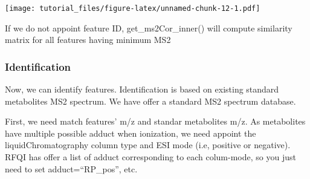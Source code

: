 \documentclass[
]{article}
\newenvironment{Shaded}{\begin{snugshade}}{\end{snugshade}}
\newcommand{\CommentTok}[1]{\textcolor[rgb]{0.56,0.35,0.01}{\textit{#1}}}
\newcommand{\DataTypeTok}[1]{\textcolor[rgb]{0.13,0.29,0.53}{#1}}
\newcommand{\DecValTok}[1]{\textcolor[rgb]{0.00,0.00,0.81}{#1}}
\newcommand{\KeywordTok}[1]{\textcolor[rgb]{0.13,0.29,0.53}{\textbf{#1}}}
\newcommand{\NormalTok}[1]{#1}
\newcommand{\OperatorTok}[1]{\textcolor[rgb]{0.81,0.36,0.00}{\textbf{#1}}}
\newcommand{\StringTok}[1]{\textcolor[rgb]{0.31,0.60,0.02}{#1}}
\begin{document}
\texttt{[image: tutorial\_files/figure-latex/unnamed-chunk-12-1.pdf]}

If we do not appoint feature ID, get\_ms2Cor\_inner() will compute
similarity matrix for all features having minimum MS2

\begin{Shaded}
\end{Shaded}

\hypertarget{identification}{%
\subsubsection{Identification}\label{identification}}

Now, we can identify features. Identification is based on existing
standard metabolites MS2 spectrum. We have offer a standard MS2 spectrum
database.

\begin{Shaded}
\end{Shaded}

First, we need match features' m/z and standar metabolites m/z. As
metabolites have multiple possible adduct when ionization, we need
appoint the liquidChromatography column type and ESI mode (i.e, positive
or negative). RFQI has offer a list of adduct corresponding to each
colum-mode, so you just need to set adduct=``RP\_pos'', etc.
\end{document}
